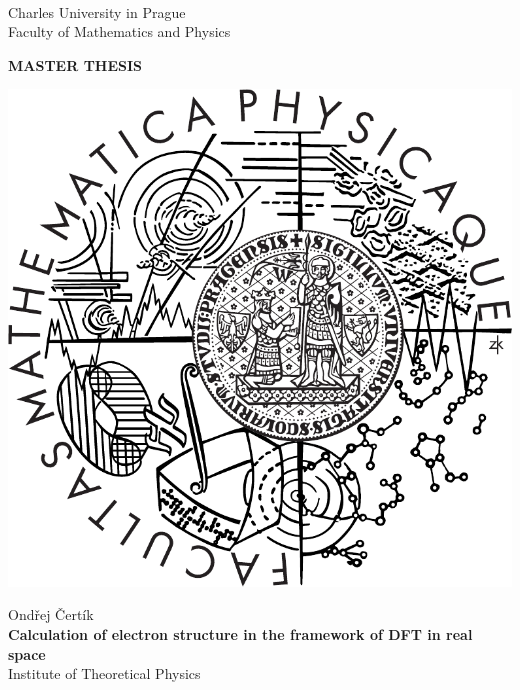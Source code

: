 \documentclass[12pt,notitlepage]{report}
\begin{document}
\begin{titlepage}
\begin{center}
\ \\

\vspace{15mm}

\large
Charles University in Prague\\
Faculty of Mathematics and Physics\\

\vspace{5mm}

{\Large\bf MASTER THESIS}

\vspace{10mm}

\includegraphics[scale=0.3]{images/logo.pdf}

\vspace{15mm}

{\Large Ondřej Čertík}\\ 
\vspace{5mm}
{\Large\bf Calculation of electron structure in the framework of DFT in real
space}\\
\vspace{5mm}
Institute of Theoretical Physics\\ %
\end{center}
\vspace{15mm}


\end{titlepage}
\end{document}
